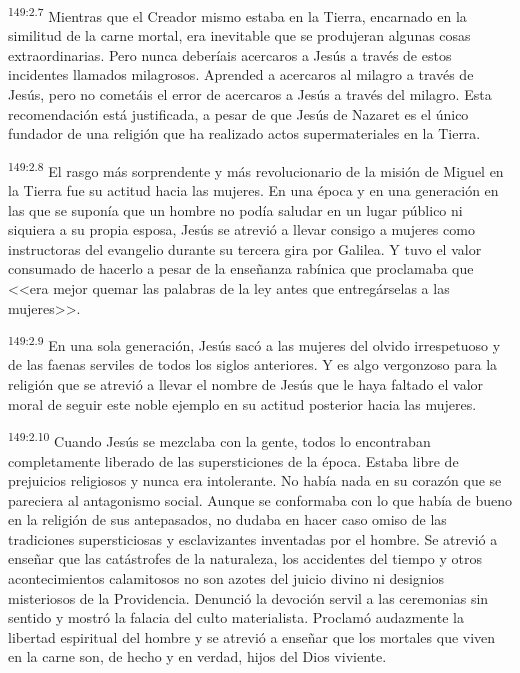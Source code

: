 \par 
\textsuperscript{149:2.7} Mientras que el Creador mismo estaba en la Tierra, encarnado en la similitud de la carne mortal, era inevitable que se produjeran algunas cosas extraordinarias. Pero nunca deberíais acercaros a Jesús a través de estos incidentes llamados milagrosos. Aprended a acercaros al milagro a través de Jesús, pero no cometáis el error de acercaros a Jesús a través del milagro. Esta recomendación está justificada, a pesar de que Jesús de Nazaret es el único fundador de una religión que ha realizado actos supermateriales en la Tierra.

\par 
\textsuperscript{149:2.8} El rasgo más sorprendente y más revolucionario de la misión de Miguel en la Tierra fue su actitud hacia las mujeres. En una época y en una generación en las que se suponía que un hombre no podía saludar en un lugar público ni siquiera a su propia esposa, Jesús se atrevió a llevar consigo a mujeres como instructoras del evangelio durante su tercera gira por Galilea. Y tuvo el valor consumado de hacerlo a pesar de la enseñanza rabínica que proclamaba que <<era mejor quemar las palabras de la ley antes que entregárselas a las mujeres>>.

\par 
\textsuperscript{149:2.9} En una sola generación, Jesús sacó a las mujeres del olvido irrespetuoso y de las faenas serviles de todos los siglos anteriores. Y es algo vergonzoso para la religión que se atrevió a llevar el nombre de Jesús que le haya faltado el valor moral de seguir este noble ejemplo en su actitud posterior hacia las mujeres.

\par 
\textsuperscript{149:2.10} Cuando Jesús se mezclaba con la gente, todos lo encontraban completamente liberado de las supersticiones de la época. Estaba libre de prejuicios religiosos y nunca era intolerante. No había nada en su corazón que se pareciera al antagonismo social. Aunque se conformaba con lo que había de bueno en la religión de sus antepasados, no dudaba en hacer caso omiso de las tradiciones supersticiosas y esclavizantes inventadas por el hombre. Se atrevió a enseñar que las catástrofes de la naturaleza, los accidentes del tiempo y otros acontecimientos calamitosos no son azotes del juicio divino ni designios misteriosos de la Providencia. Denunció la devoción servil a las ceremonias sin sentido y mostró la falacia del culto materialista. Proclamó audazmente la libertad espiritual del hombre y se atrevió a enseñar que los mortales que viven en la carne son, de hecho y en verdad, hijos del Dios viviente.

